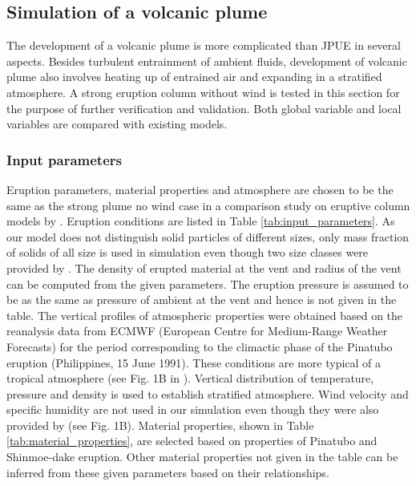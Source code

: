 \documentclass[gmd, manuscript]{copernicus}
\begin{document}
\subsection{Simulation of a volcanic plume}
The development of a volcanic plume is more complicated than JPUE in several aspects. Besides turbulent entrainment of ambient fluids, development of volcanic plume also involves heating up of entrained air and expanding in a stratified atmosphere. A strong eruption column without wind is tested in this section for the purpose of further verification and validation.
Both global variable and local variables are compared with existing models.

\subsubsection{Input parameters}
Eruption parameters, material properties and atmosphere are chosen to be the same as the strong plume no wind case in a comparison study on eruptive column models by \citet {costa2016results}. Eruption conditions are listed in Table \ref{tab:input_parameters}. As our model does not distinguish solid particles of different sizes, only mass fraction of solids of all size is used in simulation even though two size classes were provided by \citet {costa2016results}. The density of erupted material at the vent and radius of the vent can be computed from the given parameters. The eruption pressure is assumed to be as the same as pressure of ambient at the vent and hence is not given in the table. The vertical profiles of atmospheric properties were obtained based on the reanalysis data from ECMWF (European Centre for Medium-Range Weather Forecasts) for the period corresponding to the climactic phase of the Pinatubo eruption (Philippines, 15 June 1991). These conditions are more typical of a tropical atmosphere (see Fig. 1B in \citep{costa2016results}). 
Vertical distribution of temperature, pressure and density is used to establish stratified atmosphere. Wind velocity and specific humidity are not used in our simulation even though they were also provided by \citet{costa2016results} (see Fig. 1B). Material properties, shown in Table \ref{tab:material_properties}, are selected based on properties of Pinatubo and Shinmoe-dake eruption. Other material properties not given in the table can be inferred from these given parameters based on their relationships.
\end{document}
